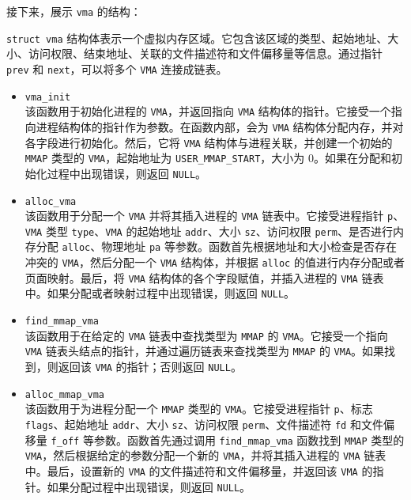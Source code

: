 \documentclass[UTF8]{article}
\begin{document}
\begin{enumerate}
        接下来，展示 \texttt{vma} 的结构：
        
        \texttt{struct vma} 结构体表示一个虚拟内存区域。它包含该区域的类型、起始地址、大小、访问权限、结束地址、关联的文件描述符和文件偏移量等信息。通过指针 \texttt{prev} 和 \texttt{next}，可以将多个 \texttt{VMA} 连接成链表。
        \begin{itemize}
          \item \texttt{vma\_init\\}
                该函数用于初始化进程的 \texttt{VMA}，并返回指向 \texttt{VMA} 结构体的指针。它接受一个指向进程结构体的指针作为参数。在函数内部，会为 \texttt{VMA} 结构体分配内存，并对各字段进行初始化。然后，它将 \texttt{VMA} 结构体与进程关联，并创建一个初始的 \texttt{MMAP} 类型的 \texttt{VMA}，起始地址为 \texttt{USER\_MMAP\_START}，大小为 0。如果在分配和初始化过程中出现错误，则返回 \texttt{NULL}。

          \item \texttt{alloc\_vma\\}
                该函数用于分配一个 \texttt{VMA} 并将其插入进程的 \texttt{VMA} 链表中。它接受进程指针 \texttt{p}、\texttt{VMA} 类型 \texttt{type}、\texttt{VMA} 的起始地址 \texttt{addr}、大小 \texttt{sz}、访问权限 \texttt{perm}、是否进行内存分配 \texttt{alloc}、物理地址 \texttt{pa} 等参数。函数首先根据地址和大小检查是否存在冲突的 \texttt{VMA}，然后分配一个 \texttt{VMA} 结构体，并根据 \texttt{alloc} 的值进行内存分配或者页面映射。最后，将 \texttt{VMA} 结构体的各个字段赋值，并插入进程的 \texttt{VMA} 链表中。如果分配或者映射过程中出现错误，则返回 \texttt{NULL}。

          \item \texttt{find\_mmap\_vma\\}
                该函数用于在给定的 \texttt{VMA} 链表中查找类型为 \texttt{MMAP} 的 \texttt{VMA}。它接受一个指向 \texttt{VMA} 链表头结点的指针，并通过遍历链表来查找类型为 \texttt{MMAP} 的 \texttt{VMA}。如果找到，则返回该 \texttt{VMA} 的指针；否则返回 \texttt{NULL}。

          \item \texttt{alloc\_mmap\_vma\\}
                该函数用于为进程分配一个 \texttt{MMAP} 类型的 \texttt{VMA}。它接受进程指针 \texttt{p}、标志 \texttt{flags}、起始地址 \texttt{addr}、大小 \texttt{sz}、访问权限 \texttt{perm}、文件描述符 \texttt{fd} 和文件偏移量 \texttt{f\_off} 等参数。函数首先通过调用 \texttt{find\_mmap\_vma} 函数找到 \texttt{MMAP} 类型的 \texttt{VMA}，然后根据给定的参数分配一个新的 \texttt{VMA}，并将其插入进程的 \texttt{VMA} 链表中。最后，设置新的 \texttt{VMA} 的文件描述符和文件偏移量，并返回该 \texttt{VMA} 的指针。如果分配过程中出现错误，则返回 \texttt{NULL}。
        \end{itemize}


\end{enumerate}
\end{document}
